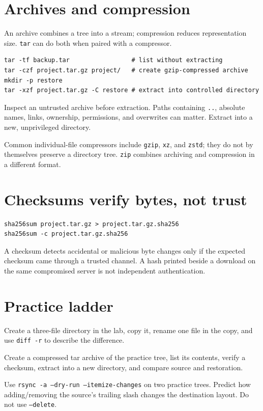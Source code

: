 \documentclass[11pt,oneside,openany]{book}
\begin{document}
\section{Archives and compression}
An archive combines a tree into a stream; compression reduces representation size. \texttt{tar} can do both when paired with a compressor.
\begin{lstlisting}
tar -tf backup.tar                 # list without extracting
tar -czf project.tar.gz project/   # create gzip-compressed archive
mkdir -p restore
tar -xzf project.tar.gz -C restore # extract into controlled directory
\end{lstlisting}
Inspect an untrusted archive before extraction. Paths containing \texttt{..}, absolute names, links, ownership, permissions, and overwrites can matter. Extract into a new, unprivileged directory.

Common individual-file compressors include \texttt{gzip}, \texttt{xz}, and \texttt{zstd}; they do not by themselves preserve a directory tree. \texttt{zip} combines archiving and compression in a different format.

\section{Checksums verify bytes, not trust}
\begin{lstlisting}
sha256sum project.tar.gz > project.tar.gz.sha256
sha256sum -c project.tar.gz.sha256
\end{lstlisting}
A checksum detects accidental or malicious byte changes only if the expected checksum came through a trusted channel. A hash printed beside a download on the same compromised server is not independent authentication.

\section{Practice ladder}
\begin{practicebox}[title={Easy -- copy and rename}]
Create a three-file directory in the lab, copy it, rename one file in the copy, and use \texttt{diff -r} to describe the difference.
\end{practicebox}
\begin{practicebox}[title={Medium -- archive lifecycle}]
Create a compressed tar archive of the practice tree, list its contents, verify a checksum, extract into a new directory, and compare source and restoration.
\end{practicebox}
\begin{practicebox}[title={Hard -- reason about synchronization}]
Use \texttt{rsync -a --dry-run --itemize-changes} on two practice trees. Predict how adding/removing the source's trailing slash changes the destination layout. Do not use \texttt{--delete}.
\end{practicebox}
\end{document}
